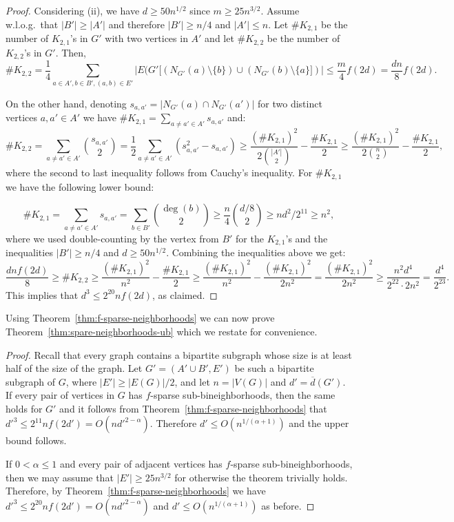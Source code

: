 \documentclass[11pt]{article}
\theoremstyle{definition}
\begin{document}
\begin{proof}
	Considering (ii), we have $d\ge 50n^{1/2}$ since $m\ge 25n^{3/2}$.  Assume w.l.o.g.\ that $|B'|\ge |A'|$ 
	and therefore $|B'| \ge n/4$ and $|A'| \le n$.
	Let $\#K_{2,1}$ be the number of $K_{2,1}$'s in $G'$ with two vertices in $A'$ and 
	let $\#K_{2,2}$ be the number of $K_{2,2}$'s in $G'$.
	Then,
	$$\#K_{2,2} =  \frac{1}{4}\sum_{a \in A', b \in B', (a,b) \in E'}  |E(G'[(N_{G'}(a)\setminus \{b\})\cup (N_{G'}(b)\setminus\{a\}])| \le \frac{m}{4}f(2d) = \frac{dn}{8} f(2d).$$ 
	
	On the other hand, denoting $s_{a,a'}=|N_{G'}(a)\cap N_{G'}(a')|$ for two distinct vertices $a, a'\in A'$ we have $\#K_{2,1} = \sum_{a\ne a' \in A'} s_{a,a'}$ and:
	$$\#K_{2,2}=\sum_{a\ne a'\in A'}\binom{s_{a,a'}}{2}=\frac{1}{2}\sum_{a\ne a'\in A'}(s_{a,a'}^2-s_{a,a'}) \ge \frac{(\#K_{2,1})^2}{2\binom{|A'|}{2}}-\frac{\#K_{2,1}}{2}\ge \frac{(\#K_{2,1})^2}{2\binom{n}{2}}-\frac{\#K_{2,1}}{2},$$
	where the second to last inequality follows from Cauchy's inequality. 
	For $\#K_{2,1}$ we have the following lower bound:	
	
	$$\#K_{2,1}=\sum_{a\ne a'\in A'}s_{a,a'} = \sum_{b \in B'} \binom{\deg(b)}{2} \ge \frac{n}{4}\binom{d/8}{2}\ge nd^2/2^{11}\ge n^2,$$
	where we used double-counting by the vertex from $B'$ for the $K_{2,1}$'s and the inequalities $|B'|\ge n/4$ and $d\ge 50n^{1/2}$. Combining the inequalities above we get:
	$$\frac{dnf(2d)}{8} \ge \#K_{2,2} \ge \frac{(\#K_{2,1})^2}{n^2}-\frac{\#K_{2,1}}{2} \ge \frac{(\#K_{2,1})^2}{n^2}-\frac{(\#K_{2,1})^2}{2n^2} = \frac{(\#K_{2,1})^2}{2n^2} \ge \frac{n^2d^4}{2^{22}\cdot 2n^2}=\frac{d^4}{2^{23}}.$$	
	This implies that $d^3\le 2^{20}nf(2d)$, as claimed.
\end{proof}

Using Theorem~\ref{thm:f-sparse-neighborhoods} we can now prove Theorem~\ref{thm:spare-neighborhoods-ub} which we restate for convenience.
\KSTub*

\begin{proof}
	Recall that every graph contains a bipartite subgraph whose size is at least half of the size of the graph.	
Let $G'=(A'\cup B',E')$ be such a bipartite subgraph of $G$, where $|E'| \ge |E(G)|/2$, and let $n=|V(G)|$ and $d'=\overline{d}(G')$.
If every pair of vertices in $G$ has $f$-sparse sub-bineighborhoods, then the same holds for $G'$ and it follows from Theorem~\ref{thm:f-sparse-neighborhoods} that $d'^3 \le 2^{11} nf(2d') = O(nd'^{2-\alpha})$.
Therefore $d' \le O(n^{1/(\alpha+1)})$ and the upper bound follows.

If $0 < \alpha \le 1$ and every pair of adjacent vertices has $f$-sparse sub-bineighborhoods, then we may assume that $|E'|\ge 25n^{3/2}$ for otherwise the theorem trivially holds.
Therefore, by Theorem~\ref{thm:f-sparse-neighborhoods} we have $d'^3 \le 2^{20} nf(2d') = O(nd'^{2-\alpha})$ and $d' \le O(n^{1/(\alpha+1)})$ as before.
\end{proof}
\end{document}
